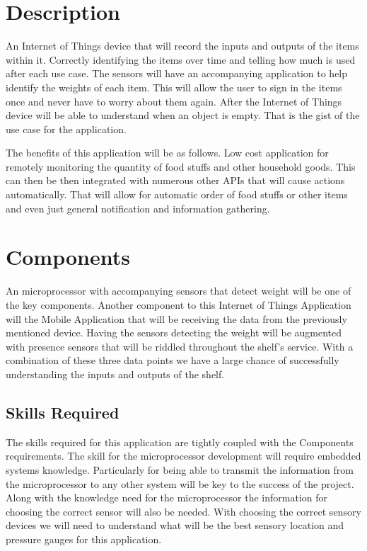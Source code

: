 \documentclass{article}
\begin{document}


\section{Description}

An Internet of Things device that will record the inputs and outputs of the items within it. 
Correctly identifying the items over time and telling how much is used after each use case.
The sensors will have an accompanying application to help identify the weights of each item.
This will allow the user to sign in the items once and never have to worry about them again.
After the Internet of Things device will be able to understand when an object is empty.
That is the gist of the use case for the application. 

The benefits of this application will be as follows. 
Low cost application for remotely monitoring the quantity of food stuffs and other household goods.
This can then be then integrated with numerous other APIs that will cause actions automatically.
That will allow for automatic order of food stuffs or other items and even just general notification and information gathering. 

\section{Components}

An microprocessor with accompanying sensors that detect weight will be one of the key components. 
Another component to this Internet of Things Application will the Mobile Application that will be receiving the data from the previously mentioned device.
Having the sensors detecting the weight will be augmented with presence sensors that will be riddled throughout the shelf's service.
With a combination of these three data points we have a large chance of successfully understanding the inputs and outputs of the shelf.

\subsection{Skills Required}

The skills required for this application are tightly coupled with the Components requirements.
The skill for the microprocessor development will require embedded systems knowledge.
Particularly for being able to transmit the information from the microprocessor to any other system will be key to the success of the project.
Along with the knowledge need for the microprocessor the information for choosing the correct sensor will also be needed.
With choosing the correct sensory devices we will need to understand what will be the best sensory location and pressure gauges for this application.
\end{document}
